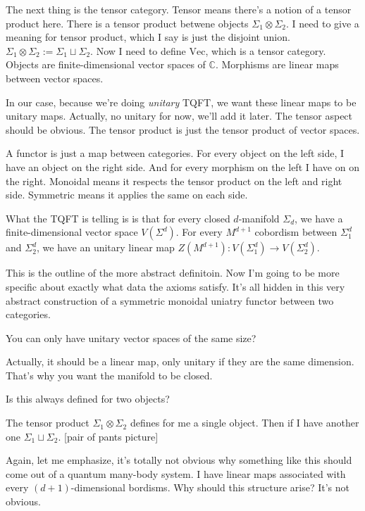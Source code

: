 The next thing is the tensor category.
Tensor means there's a notion of a tensor product here.
There is a tensor product betwene objects
$\Sigma_1\otimes\Sigma_2$.
I need to give a meaning for tensor product,
which I say is just the disjoint union.
$\Sigma_1 \otimes \Sigma_2 := \Sigma_1 \sqcup \Sigma_2$.
Now I need to define $\mathrm{Vec}$, which is a tensor category.
Objects are finite-dimensional vector spaces of $\mathbb{C}$.
Morphisms are linear maps between vector spaces.

In our case,
because we're doing \emph{unitary} TQFT,
we want these linear maps to be unitary maps.
Actually, no unitary for now, we'll add it later.
The tensor aspect should be obvious.
The tensor product is just the tensor product of vector spaces.

A functor is just a map between categories.
For every object on the left side,
I have an object on the right side.
And for every morphism on the left I have on on the right.
Monoidal means it respects the tensor product on the left and right side.
Symmetric means it applies the same on each side.

What the TQFT is telling is is that
for every closed $d$-manifold $\Sigma_d$,
we have a finite-dimensional vector space $V(\Sigma^d)$.
For every $M^{d+1}$ cobordism between
$\Sigma_1^d$ and $\Sigma_2^d$,
we have an unitary linear map
$Z(M^{d+1}):V(\Sigma_1^d)\to V(\Sigma_2^d)$.

This is the outline of the more abstract definitoin.
Now I'm going to be more specific about exactly what data the axioms satisfy.
It's all hidden in this very abstract construction of a symmetric monoidal
uniatry functor between two categories.



\begin{question}
    You can only have unitary vector spaces of the same size?
\end{question}
Actually, it should be a linear map,
only unitary if they are the same dimension.
That's why you want the manifold to be closed.

\begin{question}
    Is this always defined for two objects?
\end{question}
The tensor product $\Sigma_1\otimes\Sigma_2$ defines for me a single object.
Then if I have another one
$\Sigma_1\sqcup\Sigma_2$.
[pair of pants picture]

Again, let me emphasize,
it's totally not obvious why something like this should come out of a quantum
many-body system.
I have linear maps associated with every $(d+1)$-dimensional bordisms.
Why should this structure arise?
It's not obvious.

